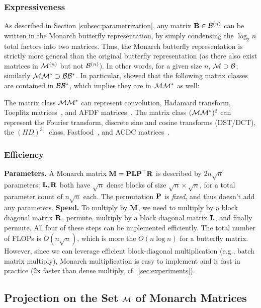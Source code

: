 \subsubsection{Expressiveness}
As described in Section \ref{subsec:parametrization}, any matrix $\mathbf{B} \in \mathcal{B}^{(n)}$ can be written in the Monarch butterfly
representation, by simply condensing the $\log_2 n$ total factors into two matrices.
Thus, the Monarch butterfly representation is strictly more general than the original
butterfly representation (as there also exist matrices in $\mathcal{M}^{(n)}$ but not $\mathcal{B}^{(n)}$).
In other words, for a given size $n$, $\mathcal{M} \supset \mathcal{B}$; similarly $\mathcal{M}\mathcal{M}^* \supset \mathcal{B}\mathcal{B}^*$. 
In particular, \citet{dao2020kaleidoscope} showed that the following matrix classes are contained in $\mathcal{B}\mathcal{B}^*$,
which implies they are in $\mathcal{M}\mathcal{M}^*$ as well:
\begin{proposition}\label{thm:Monarch_expressiveness}
  The matrix class $\mathcal{M}\mathcal{M}^*$ can represent convolution, Hadamard
  transform, Toeplitz matrices~\citep{gray2006toeplitz}, and AFDF
  matrices~\citep{moczulski2015acdc}.
  The matrix class $(\mathcal{M}\mathcal{M}^*)^2$ can represent the Fourier transform, discrete sine and cosine
  transforms (DST/DCT), the $(HD)^3$~\citep{yu2016orthogonal} class,
  Fastfood~\citep{le2013fastfood}, and ACDC matrices~\citep{moczulski2015acdc}.
\end{proposition}



\subsubsection{Efficiency}
\textbf{Parameters.} A Monarch matrix $\mathbf{M} = \mathbf{P}\mathbf{L}\mathbf{P}^\top \mathbf{R}$ is described by $2 n \sqrt{n}$ parameters:
$\mathbf{L}, \mathbf{R}$ both have $\sqrt{n}$ dense blocks of size $\sqrt{n} \times \sqrt{n}$, for a total
parameter count of $n\sqrt{n}$ each. The permutation $\mathbf{P}$ is \emph{fixed}, and thus doesn't add any parameters.
\textbf{Speed.}
To multiply by $\mathbf{M}$, we need to multiply by a block diagonal matrix $\mathbf{R}$, permute,
multiply by a block diagonal matrix $\mathbf{L}$, and finally permute.
All four of these steps can be implemented efficiently.
The total number of FLOPs is $O(n \sqrt{n})$, which is more the $O(n \log n)$ for
a butterfly matrix.
However, since we can leverage efficient block-diagonal multiplication (e.g.,
batch matrix multiply), Monarch multiplication is easy to
implement and is fast in practice (2x faster than dense multiply, cf.\ \cref{sec:experiments}).

\subsection{Projection on the Set $\mathcal{M}$ of Monarch Matrices}
\label{subsec:projection}

